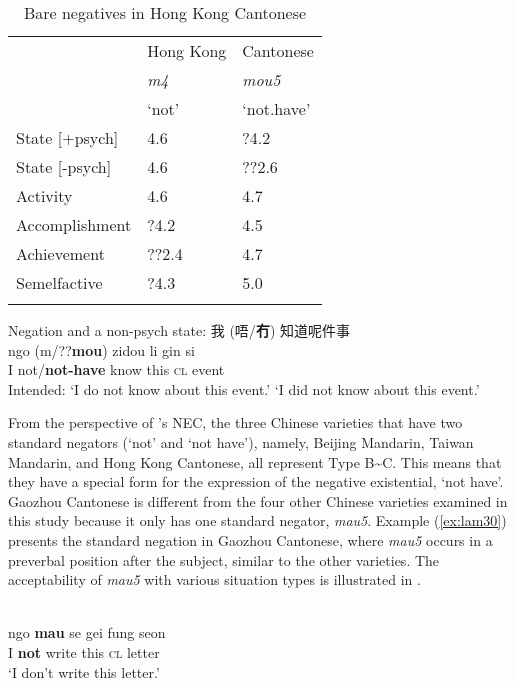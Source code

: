 \documentclass[output=paper]{langscibook}
\begin{document}
\begin{table}
  \begin{tabularx}{\textwidth}{L{2.8cm}XX}
    \lsptoprule
    & Hong Kong & Cantonese\\
    & \textit{m4} & \textit{mou5}\\
    & `not' & `not.have'\\
     \midrule
State [+psych] &  4.6 & ?4.2\\
State [-psych] &  4.6 & ??2.6\\
Activity &  4.6 &  4.7\\
Accomplishment & ?4.2 &  4.5\\
Achievement & ??2.4 &  4.7\\
Semelfactive & ?4.3 &  5.0\\
\lspbottomrule
\end{tabularx}
  \caption{Bare negatives in Hong Kong Cantonese}
  \label{tab:lam7}
\end{table}

\ea Negation and a non-psych state:  {\cn 我 (唔/\textbf{冇}) 知道呢件事} \label{ex:lam29}\\
	\gll ngo (m/??\textbf{mou}) zidou li	gin	si\\
	I not/\textbf{not-have} know this \textsc{cl} event\\
	\glt Intended: `I do not know about this event.' `I did not know about this event.'
\z

From the perspective of \citeauthor{Croft1991}'s NEC, the three Chinese varieties that have two standard negators (`not' and `not have'), namely, Beijing Mandarin, Taiwan Mandarin, and Hong Kong Cantonese, all represent Type B\sim C. This means that they have a special form for the expression of the negative existential, `not have'. Gaozhou Cantonese is different from the four other Chinese varieties examined in this study because it only has one standard negator, \textit{mau5}. Example (\ref{ex:lam30}) presents the standard negation in Gaozhou Cantonese, where \textit{mau5} occurs in a preverbal position after the subject, similar to the other varieties. The acceptability of \textit{mau5} with various situation types is illustrated in .

\\
	\gll ngo \textbf{mau} se gei fung seon\\
	I \textbf{not} write this \textsc{cl} letter\\
	\glt `I don't write this letter.'
\z
\end{document}
